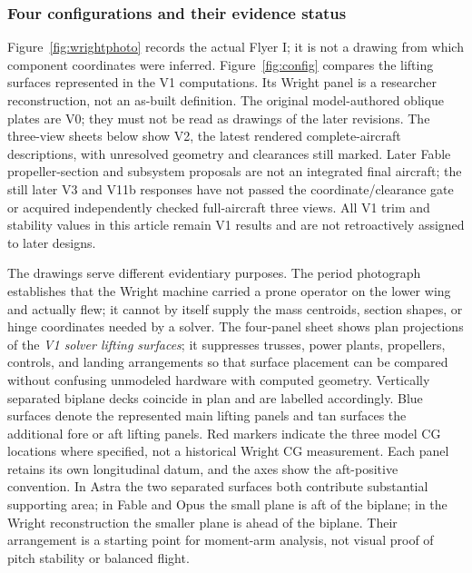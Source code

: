 \documentclass[10pt,letterpaper]{article}
\begin{document}
\subsubsection{Four configurations and their evidence status}
Figure~\ref{fig:wrightphoto} records the actual Flyer I; it is not a drawing from which component coordinates were inferred. Figure~\ref{fig:config} compares the lifting surfaces represented in the V1 computations. Its Wright panel is a researcher reconstruction, not an as-built definition. The original model-authored oblique plates are V0; they must not be read as drawings of the later revisions. The three-view sheets below show V2, the latest rendered complete-aircraft descriptions, with unresolved geometry and clearances still marked. Later Fable propeller-section and subsystem proposals are not an integrated final aircraft; the still later V3 and V11b responses have not passed the coordinate/clearance gate or acquired independently checked full-aircraft three views. All V1 trim and stability values in this article remain V1 results and are not retroactively assigned to later designs.

The drawings serve different evidentiary purposes. The period photograph establishes that the Wright machine carried a prone operator on the lower wing and actually flew; it cannot by itself supply the mass centroids, section shapes, or hinge coordinates needed by a solver. The four-panel sheet shows plan projections of the \emph{V1 solver lifting surfaces}; it suppresses trusses, power plants, propellers, controls, and landing arrangements so that surface placement can be compared without confusing unmodeled hardware with computed geometry. Vertically separated biplane decks coincide in plan and are labelled accordingly. Blue surfaces denote the represented main lifting panels and tan surfaces the additional fore or aft lifting panels. Red markers indicate the three model CG locations where specified, not a historical Wright CG measurement. Each panel retains its own longitudinal datum, and the axes show the aft-positive convention. In Astra the two separated surfaces both contribute substantial supporting area; in Fable and Opus the small plane is aft of the biplane; in the Wright reconstruction the smaller plane is ahead of the biplane. Their arrangement is a starting point for moment-arm analysis, not visual proof of pitch stability or balanced flight.
\end{document}
